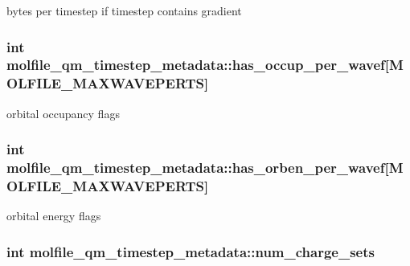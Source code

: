 bytes per timestep if timestep contains gradient \hypertarget{structmolfile__qm__timestep__metadata_a781a991e5f3ff417b9060bca6dfa63ca}{
\subsubsection[{has\-\_\-occup\-\_\-per\-\_\-wavef}]{\setlength{\rightskip}{0pt plus 5cm}int {\bf molfile\-\_\-qm\-\_\-timestep\-\_\-metadata\-::has\-\_\-occup\-\_\-per\-\_\-wavef}\mbox{[}{\bf \-M\-O\-L\-F\-I\-L\-E\-\_\-\-M\-A\-X\-W\-A\-V\-E\-P\-E\-R\-T\-S}\mbox{]}}}\label{structmolfile__qm__timestep__metadata_a781a991e5f3ff417b9060bca6dfa63ca}
orbital occupancy flags \hypertarget{structmolfile__qm__timestep__metadata_a495c33e580a5271b3c4380e09953f12b}{
\subsubsection[{has\-\_\-orben\-\_\-per\-\_\-wavef}]{\setlength{\rightskip}{0pt plus 5cm}int {\bf molfile\-\_\-qm\-\_\-timestep\-\_\-metadata\-::has\-\_\-orben\-\_\-per\-\_\-wavef}\mbox{[}{\bf \-M\-O\-L\-F\-I\-L\-E\-\_\-\-M\-A\-X\-W\-A\-V\-E\-P\-E\-R\-T\-S}\mbox{]}}}\label{structmolfile__qm__timestep__metadata_a495c33e580a5271b3c4380e09953f12b}
orbital energy flags \hypertarget{structmolfile__qm__timestep__metadata_a4c5bf87213909fd4f96b1186aa3161c0}{
\subsubsection[{num\-\_\-charge\-\_\-sets}]{\setlength{\rightskip}{0pt plus 5cm}int {\bf molfile\-\_\-qm\-\_\-timestep\-\_\-metadata\-::num\-\_\-charge\-\_\-sets}}}\label{structmolfile__qm__timestep__metadata_a4c5bf87213909fd4f96b1186aa3161c0}

